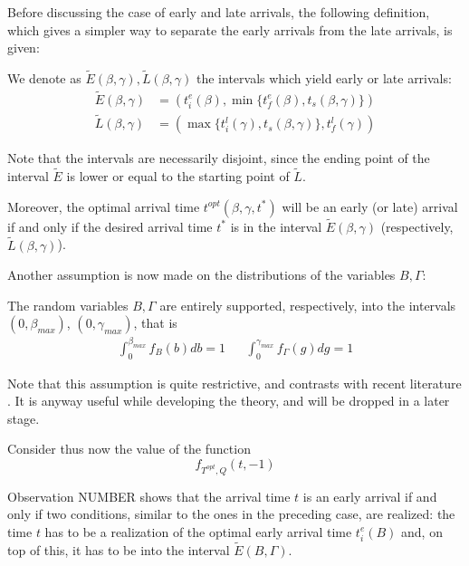Before discussing the case of early and late arrivals,
the following definition,
which gives a simpler way to separate the early arrivals from the late arrivals,
is given:

\begin{definition}
  \label{def:intervals-tilde}
  We denote as \(\tilde{E}(\beta, \gamma), \tilde{L}(\beta, \gamma)\) the intervals which yield early or late arrivals:
  \begin{align*}
    \tilde{E}(\beta, \gamma) & = (t_i^e(\beta), \min\{t_f^e(\beta), t_s(\beta, \gamma)\})\\
    \tilde{L}(\beta, \gamma) & = (\max\{t_i^l(\gamma), t_s(\beta, \gamma)\}, t_f^l(\gamma))
  \end{align*}
\end{definition}

Note that the intervals are necessarily disjoint,
since the ending point of the interval \(\tilde{E}\) is lower or equal to the starting point of \(\tilde{L}\).

Moreover,
the optimal arrival time \(t^{opt}(\beta, \gamma, t^*)\) will be an early (or late) arrival
if and only if the desired arrival time \(t^*\)
is in the interval \(\tilde{E}(\beta, \gamma)\) (respectively, \(\tilde{L}(\beta, \gamma)\)).

Another assumption is now made on the distributions of the variables \(B, \Gamma\):

\begin{assumption}
  \label{ass:domain-rv}
  The random variables \(B, \Gamma\) are entirely supported, respectively,
  into the intervals \((0, \beta_{max})\), \((0, \gamma_{max})\),
  that is
  \begin{align*}
    \int_0^{\beta_{max}}f_B(b) db = 1 && \int_0^{\gamma_{max}}f_\Gamma(g) dg = 1
  \end{align*}
\end{assumption}

Note that this assumption is quite restrictive,
and contrasts with recent literature \cite[see][]{hall2024inframarginal}.
It is anyway useful while developing the theory,
and will be dropped in a later stage.

Consider thus now the value of the function
\begin{equation*}
  f_{T^{opt}, Q}(t, -1)
\end{equation*}

Observation NUMBER shows that the arrival time \(t\) is an early arrival if and only if two conditions,
similar to the ones in the preceding case,
are realized:
the time \(t\) has to be a realization of the optimal early arrival time \(t_i^e(B)\) and,
on top of this, it has to be into the interval \(\tilde{E}(B, \Gamma)\).

